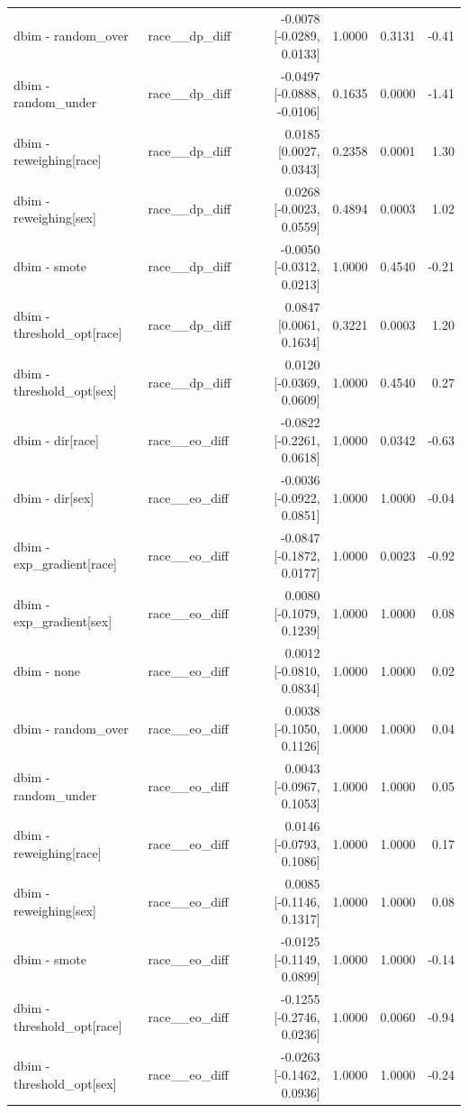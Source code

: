 \begin{table}[t]
{\begin{tabular}{llrrrr}
dbim - random\_over & race\_\_dp\_diff & -0.0078 [-0.0289, 0.0133] & 1.0000 & 0.3131 & -0.41 \\
dbim - random\_under & race\_\_dp\_diff & -0.0497 [-0.0888, -0.0106] & 0.1635 & 0.0000 & -1.41 \\
dbim - reweighing[race] & race\_\_dp\_diff & 0.0185 [0.0027, 0.0343] & 0.2358 & 0.0001 & 1.30 \\
dbim - reweighing[sex] & race\_\_dp\_diff & 0.0268 [-0.0023, 0.0559] & 0.4894 & 0.0003 & 1.02 \\
dbim - smote & race\_\_dp\_diff & -0.0050 [-0.0312, 0.0213] & 1.0000 & 0.4540 & -0.21 \\
dbim - threshold\_opt[race] & race\_\_dp\_diff & 0.0847 [0.0061, 0.1634] & 0.3221 & 0.0003 & 1.20 \\
dbim - threshold\_opt[sex] & race\_\_dp\_diff & 0.0120 [-0.0369, 0.0609] & 1.0000 & 0.4540 & 0.27 \\
dbim - dir[race] & race\_\_eo\_diff & -0.0822 [-0.2261, 0.0618] & 1.0000 & 0.0342 & -0.63 \\
dbim - dir[sex] & race\_\_eo\_diff & -0.0036 [-0.0922, 0.0851] & 1.0000 & 1.0000 & -0.04 \\
dbim - exp\_gradient[race] & race\_\_eo\_diff & -0.0847 [-0.1872, 0.0177] & 1.0000 & 0.0023 & -0.92 \\
dbim - exp\_gradient[sex] & race\_\_eo\_diff & 0.0080 [-0.1079, 0.1239] & 1.0000 & 1.0000 & 0.08 \\
dbim - none & race\_\_eo\_diff & 0.0012 [-0.0810, 0.0834] & 1.0000 & 1.0000 & 0.02 \\
dbim - random\_over & race\_\_eo\_diff & 0.0038 [-0.1050, 0.1126] & 1.0000 & 1.0000 & 0.04 \\
dbim - random\_under & race\_\_eo\_diff & 0.0043 [-0.0967, 0.1053] & 1.0000 & 1.0000 & 0.05 \\
dbim - reweighing[race] & race\_\_eo\_diff & 0.0146 [-0.0793, 0.1086] & 1.0000 & 1.0000 & 0.17 \\
dbim - reweighing[sex] & race\_\_eo\_diff & 0.0085 [-0.1146, 0.1317] & 1.0000 & 1.0000 & 0.08 \\
dbim - smote & race\_\_eo\_diff & -0.0125 [-0.1149, 0.0899] & 1.0000 & 1.0000 & -0.14 \\
dbim - threshold\_opt[race] & race\_\_eo\_diff & -0.1255 [-0.2746, 0.0236] & 1.0000 & 0.0060 & -0.94 \\
dbim - threshold\_opt[sex] & race\_\_eo\_diff & -0.0263 [-0.1462, 0.0936] & 1.0000 & 1.0000 & -0.24 \\
\bottomrule
\end{tabular}}
\end{table}
